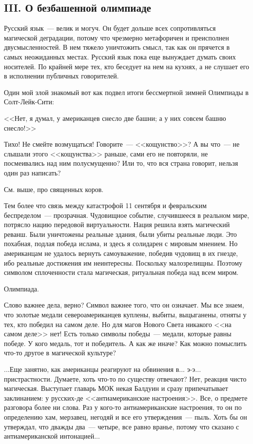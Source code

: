 \documentclass{scrbook}
\newcommand{\flqq}{<<}
\newcommand{\frqq}{>>}
\newcommand{\mdash}{~--- }
\newcommand{\essaysection}[1]{\subsection*{#1}\nopagebreak}
\begin{document}
\essaysection{III. О безбашенной олимпиаде}

Русский язык{\mdash}велик и могуч. Он будет дольше всех сопротивляться магической деградации, потому что чрезмерно метафоричен и преисполнен двусмысленностей. В нем тяжело уничтожить смысл, так как он прячется в самых неожиданных местах. Русский язык пока еще вынуждает думать своих носителей. По крайней мере тех, кто беседует на нем на кухнях, а не слушает его в исполнении публичных говорителей.

Один мой злой знакомый вот как подвел итоги бессмертной зимней Олимпиады в Солт-Лейк-Сити:

{\flqq}Нет, я думал, у американцев снесло две башни; а у них совсем башню снесло!{\frqq}

Тихо! Не смейте возмущаться! Говорите{\mdash}{\flqq}кощунство{\frqq}? А вы что{\mdash}не слышали этого {\flqq}кощунства{\frqq} раньше, сами его не повторяли, не посмеивались над ним полусмущенно? Или то, что вся страна говорит, нельзя один раз написать?

См. выше, про священных коров.

Тем более что связь между катастрофой 11 сентября и февральским беспределом{\mdash}прозрачная. Чудовищное событие, случившееся в реальном мире, потрясло нацию передовой виртуальности. Нация решила взять магический реванш. Были уничтожены реальные здания, были убиты реальные люди. Это похабная, подлая победа ислама, и здесь я солидарен с мировым мнением. Но американцам не удалось вернуть самоуважение, победив чудовищ в их гнезде, ибо реальные достижения им неинтересны. Поскольку малозрелищны. Поэтому символом сплоченности стала магическая, ритуальная победа над всем миром.

Олимпиада.

Слово важнее дела, верно? Символ важнее того, что он означает. Мы все знаем, что золотые медали североамериканцев куплены, выбиты, выцыганены, отняты у тех, кто победил на самом деле. Но для магов Нового Света никакого {\flqq}на самом деле{\frqq} нет! Есть только символы победы{\mdash}медали, которые равны победе. У кого медаль, тот и победитель. А как же иначе? Как можно помыслить что-то другое в магической культуре?

...Еще занятно, как американцы реагируют на обвинения в... э-э... пристрастности. Думаете, хоть что-то по существу отвечают? Нет, реакция чисто магическая. Выступает главарь МОК некая Балдуин и сразу припечатывает заклинанием: у русских-де {\flqq}антиамериканские настроения{\frqq}. Все, о предмете разговора более ни слова. Раз у кого-то антиамериканские настроения, то он по определению хам, мерзавец, негодяй и все его утверждения{\mdash}пыль. Хоть бы он утверждал, что дважды два{\mdash}четыре, все равно вранье, потому что сказано с антиамериканской интонацией...
\end{document}
